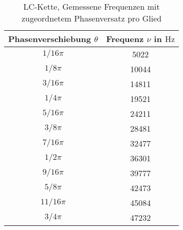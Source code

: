\begin{table}
\centering
\caption{LC-Kette, Gemessene Frequenzen mit zugeordnetem Phasenversatz pro Glied}
\label{tab: dispersion_LC}
\begin{tabular}{S S }
\toprule
{Phasenverschiebung $\theta$} & {Frequenz $\nu$ in $\si{\hertz}$}  \\
\midrule
{${1}/{16}\pi$}  & 5022\\
{${1}/{8}\pi$}  & 10044\\
{${3}/{16}\pi$}  & 14811\\
{${1}/{4}\pi$}  & 19521\\
{${5}/{16}\pi$}  & 24211\\
{${3}/{8}\pi$}  & 28481\\
{${7}/{16}\pi$}  & 32477\\
{${1}/{2}\pi$}  & 36301\\
{${9}/{16}\pi$}  & 39777\\
{${5}/{8}\pi$}  & 42473\\
{${11}/{16}\pi$}  & 45084\\
{${3}/{4}\pi$}  & 47232\\
\bottomrule
\end{tabular}
\end{table}
